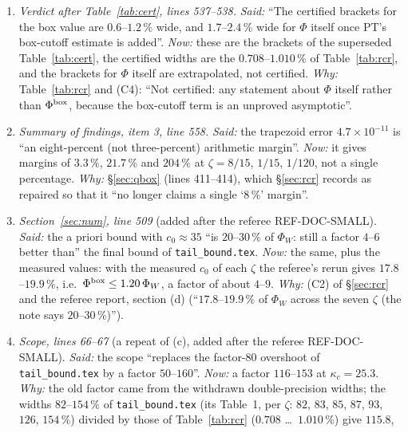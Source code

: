 \documentclass[11pt]{article}
\begin{document}
\begin{enumerate}[label=(\alph*),leftmargin=2.4em]
 built on them are withdrawn; at $\kappa_c=25.3$ the corrected values are in Table~\ref{tab:rcr}.
 \emph{Why:} \S\ref{sec:rcr}, item (P): the double-precision $\Phi_{\rm off}$ is float64 noise, and
 the column is withdrawn.
\item \emph{Verdict after Table~\ref{tab:cert}, lines 537--538.}  \emph{Said:} ``The certified
 brackets for the box value are $0.6$--$1.2\,\%$ wide, and $1.7$--$2.4\,\%$ wide for $\Phi$ itself
 once PT's box-cutoff estimate is added''.  \emph{Now:} these are the brackets of the superseded
 Table~\ref{tab:cert}, the certified widths are the $0.708$--$1.010\,\%$ of Table~\ref{tab:rcr},
 and the brackets for $\Phi$ itself are extrapolated, not certified.  \emph{Why:}
 Table~\ref{tab:rcr} and (C4): ``Not certified: any statement about $\Phi$ itself rather than
 $\Phi^{\rm box}$, because the box-cutoff term is an unproved asymptotic''.
\item \emph{Summary of findings, item 3, line 558.}  \emph{Said:} the trapezoid error
 $4.7\times10^{-11}$ is ``an eight-percent (not three-percent) arithmetic margin''.  \emph{Now:} it
 gives margins of $3.3\,\%$, $21.7\,\%$ and $204\,\%$ at $\zeta=8/15$, $1/15$, $1/120$, not a
 single percentage.  \emph{Why:} \S\ref{sec:qbox} (lines 411--414), which \S\ref{sec:rcr} records
 as repaired so that it ``no longer claims a single `$8\,\%$' margin''.
\item \emph{Section~\ref{sec:num}, line 509} (added after the referee REF-DOC-SMALL).
 \emph{Said:} the a priori bound with $c_0\approx35$ ``is $20$--$30\,\%$ of $\Phi_W$: still a factor
 $4$--$6$ better than'' the final bound of \texttt{tail\_bound.tex}.  \emph{Now:} the same, plus
 the measured values: with the measured $c_0$ of each $\zeta$ the referee's rerun gives
 $17.8$--$19.9\,\%$, i.e.\ $\Phi^{\rm box}\le1.20\,\Phi_W$, a factor of about $4$--$9$.
 \emph{Why:} (C2) of \S\ref{sec:rcr} and the referee report, section (d) (``$17.8$--$19.9\,\%$ of
 $\Phi_W$ across the seven $\zeta$ (the note says $20$--$30\,\%$)'').
\item \emph{Scope, lines 66--67} (a repeat of (c), added after the referee REF-DOC-SMALL).
 \emph{Said:} the scope ``replaces the factor-$80$ overshoot of \texttt{tail\_bound.tex} by a
 factor $50$--$160$''.  \emph{Now:} a factor $116$--$153$ at $\kappa_c=25.3$.  \emph{Why:} the old
 factor came from the withdrawn double-precision widths; the widths $82$--$154\,\%$ of
 \texttt{tail\_bound.tex} (its Table~1, per $\zeta$: $82$, $83$, $85$, $87$, $93$, $126$,
 $154\,\%$) divided by those of Table~\ref{tab:rcr} ($0.708$ \dots\ $1.010\,\%$) give $115.8$,

\end{enumerate}
\end{document}

